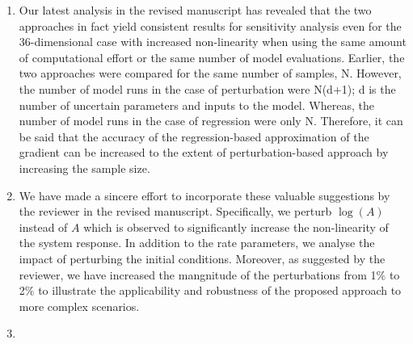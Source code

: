 \documentclass[11pt,final]{article}
\newcommand{\referee}[1]{\vspace{.1ex}\noindent{\textcolor{blue}{#1}}}
\begin{document}
\begin{enumerate}[wide, labelwidth=!, labelindent=0pt]
\item \referee{For Figure 8b, the reasoning why E$_15$ was not captured by the regression approach,
is not satisfactory. I think the authors could have gone a bit deeper in order to explain this
glaring miss of the regression-based approach. There is some discussion in Section 6, but it is
equally unsatisfactory.}

\noindent Our latest analysis in the revised manuscript has revealed that the two approaches
in fact yield consistent results
for sensitivity analysis even for the 36-dimensional case with increased non-linearity
when using the same amount of
computational effort or the same number of model evaluations. Earlier, the two approaches were
compared for the same number of samples, N. However, the number of model runs in the case of
perturbation were N(d+1); d is the number of uncertain parameters and inputs to the model. Whereas,
the number of model runs in the case of regression were only N. Therefore, it can be said that
the accuracy of the regression-based approximation of the gradient can be increased to the 
extent of perturbation-based approach by increasing the sample size. 

\item \referee{14.4-8: the near-linearity simply makes the problem extremely benign, nearly any
reasonable method would have captured such behavior. It would have been great to consider more
complicated case (more than simply going from 19 to 33 parameters), perhaps looking at logA 
perturbation instead of A would help? Also consider more than 1$\%$ 
perturbations to the input. Otherwise, the problem is too simple and does not do justice to the method.}

\noindent We have made a sincere effort to incorporate these valuable suggestions by the 
reviewer in the revised manuscript. 
Specifically, we perturb $\log(A)$ instead of $A$ which is observed to significantly increase
the non-linearity of the system response. In addition to the rate parameters, we analyse the impact
of perturbing the initial conditions. Moreover, as suggested by the reviewer, we have
increased the mangnitude of the perturbations from 1$\%$ to 2$\%$ to illustrate the applicability
and robustness of the proposed approach to more complex scenarios. 

\item \referee{14.8: here and in a few other places, I have an issue with statements like
active subspace is 1-dimensional'. To me, active subspace is as many dimensional as one likes,
so the statement should be changed to something like '1-dimensional active subspace captures
most of the variance/uncertainty/dynamics etc..', or '1-dimensional active subspace provides
very accurate approximation...'.}


\end{enumerate}
\end{document}
